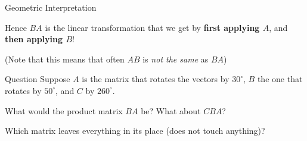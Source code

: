 \documentclass{beamer}
\begin{document}
\begin{frame}{Geometric Interpretation }

Hence $BA$ is the linear transformation that we get by \textbf{first applying $A$}, and \textbf{then applying $B$}!

\pause

(Note that this means that often $AB$ is \textit{not the same} as $BA$)

\pause


\bigskip

\begin{block}{Question}
    Suppose $A$ is the matrix that rotates the vectors by $30^\circ$,  $B$ the one that rotates by $50^\circ$, and $C$ by $260^\circ$.

    \pause

    What would the product matrix $BA$ be? \pause 
    What about $CBA$?
\end{block}

\bigskip

\pause

Which matrix leaves everything in its place (does not touch anything)?

\end{frame}
\end{document}
